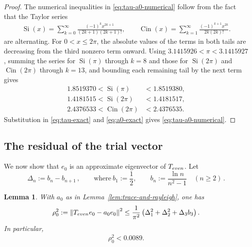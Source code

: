 \documentclass[10pt,a4paper]{amsart}
\newtheorem{lemma}[theorem]{Lemma}
\newcommand{\norm}[1]{\left\lVert #1\right\rVert}
\begin{document}
\begin{proof}
The numerical inequalities in
\eqref{eq:tau-a0-numerical} follow from the fact that the Taylor series
\begin{align*}
\operatorname{Si}(x)
=\sum_{k=0}^\infty
\frac{(-1)^k x^{2k+1}}{(2k+1)(2k+1)!},
\qquad
\operatorname{Cin}(x)
=\sum_{k=1}^\infty
\frac{(-1)^{k+1}x^{2k}}{2k(2k)!}.
\end{align*}
are alternating. For $0<x\leq2\pi$, the absolute values of the terms in both tails
are decreasing from the third nonzero term onward.  Using
$3.1415926<\pi<3.1415927$, summing the series for
$\operatorname{Si}(\pi)$ through $k=8$ and those for
$\operatorname{Si}(2\pi)$ and $\operatorname{Cin}(2\pi)$ through
$k=13$, and bounding each remaining tail by the next term gives
\begin{align*}
1.8519370<\operatorname{Si}(\pi)&<1.8519380,\\
1.4181515<\operatorname{Si}(2\pi)&<1.4181517,\\
2.4376533<\operatorname{Cin}(2\pi)&<2.4376535.
\end{align*}
Substitution in \eqref{eq:tau-exact} and \eqref{eq:a0-exact} gives
\eqref{eq:tau-a0-numerical}.
\end{proof}



\subsection*{The residual of the trial vector}

We now show that $e_0$ is an approximate eigenvector of $T_{\rm even}$. Let
\[
\Delta_n:=b_n-b_{n+1} \,,
\qquad\text{where}\ 
b_1:=\frac12,
\qquad
b_n:=\frac{\ln n}{n^2-1}\quad(n\geq2) \,.
\]

\begin{lemma}\label{lem:e0-residual}
With $a_0$ as in Lemma~\ref{lem:trace-and-rayleigh}, one has
\begin{equation}\label{eq:rho-explicit-bound}
\rho_0^2:=\norm{T_{\rm even}e_0-a_0e_0}^2 \leq \frac{1}{\pi^2} \left(\Delta_1^2+\Delta_2^2+\Delta_3b_3\right).
\end{equation}
In particular,
\begin{align}
    \label{eq:e0-residual}
    \rho_0^2 < 0.0089.
\end{align}
\end{lemma}
\end{document}
